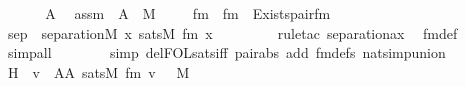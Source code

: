 \begin{isabellebody}
%
\isadelimproof
%
\endisadelimproof
%
\isatagproof
{}\isamarkupfalse%
\ {\isacharminus}{\kern0pt}\ \isanewline
\ \ \isamarkupfalse%
\ A\ \isamarkupfalse%
\ assm\ {\isacharcolon}{\kern0pt}\ {\isachardoublequoteopen}A\ {\isasymin}\ M{\isachardoublequoteclose}\ \isanewline
\ \ \isamarkupfalse%
\ fm\ \ {\isachardoublequoteopen}fm\ {\isasymequiv}\ Exists{\isacharparenleft}{\kern0pt}pair{\isacharunderscore}{\kern0pt}fm{\isacharparenleft}{\kern0pt}{}{\isacharcomma}{\kern0pt}\ {}{\isacharcomma}{\kern0pt}\ {}{\isacharparenright}{\kern0pt}{\isacharparenright}{\kern0pt}\ {\isachardoublequoteclose}\ \isanewline
\ \ \isamarkupfalse%
\ sep\ {\isacharcolon}{\kern0pt}\ {\isachardoublequoteopen}separation{\isacharparenleft}{\kern0pt}{\isacharhash}{\kern0pt}{\isacharhash}{\kern0pt}M{\isacharcomma}{\kern0pt}\ {\isasymlambda}x{\isachardot}{\kern0pt}\ sats{\isacharparenleft}{\kern0pt}M{\isacharcomma}{\kern0pt}\ fm{\isacharcomma}{\kern0pt}\ {\isacharbrackleft}{\kern0pt}x{\isacharbrackright}{\kern0pt}\ {\isacharat}{\kern0pt}\ {\isacharbrackleft}{\kern0pt}{\isacharbrackright}{\kern0pt}{\isacharparenright}{\kern0pt}{\isacharparenright}{\kern0pt}{\isachardoublequoteclose}\ \isanewline
\ \ \ \ \isamarkupfalse%
\ {\isacharparenleft}{\kern0pt}rule{\isacharunderscore}{\kern0pt}tac\ separation{\isacharunderscore}{\kern0pt}ax{\isacharparenright}{\kern0pt}\ \isamarkupfalse%
\ fm{\isacharunderscore}{\kern0pt}def\ \isamarkupfalse%
\ simp{\isacharunderscore}{\kern0pt}all\ \ \isanewline
\ \ \ \ \isamarkupfalse%
\ {\isacharparenleft}{\kern0pt}simp\ del{\isacharcolon}{\kern0pt}FOL{\isacharunderscore}{\kern0pt}sats{\isacharunderscore}{\kern0pt}iff\ pair{\isacharunderscore}{\kern0pt}abs\ add{\isacharcolon}{\kern0pt}\ fm{\isacharunderscore}{\kern0pt}defs\ nat{\isacharunderscore}{\kern0pt}simp{\isacharunderscore}{\kern0pt}union{\isacharparenright}{\kern0pt}\ \isamarkupfalse%
\ \isanewline
\ \ \isamarkupfalse%
\ \isamarkupfalse%
\ H{\isacharcolon}{\kern0pt}\ {\isachardoublequoteopen}{\isacharbraceleft}{\kern0pt}\ v\ {\isasymin}\ A{\isasymtimes}A{\isachardot}{\kern0pt}\ sats{\isacharparenleft}{\kern0pt}M{\isacharcomma}{\kern0pt}\ fm{\isacharcomma}{\kern0pt}\ {\isacharbrackleft}{\kern0pt}v{\isacharbrackright}{\kern0pt}{\isacharat}{\kern0pt}{\isacharbrackleft}{\kern0pt}{\isacharbrackright}{\kern0pt}{\isacharparenright}{\kern0pt}\ {\isacharbraceright}{\kern0pt}\ {\isasymin}\ M{\isachardoublequoteclose}\ \ \isanewline

\end{isabellebody}

